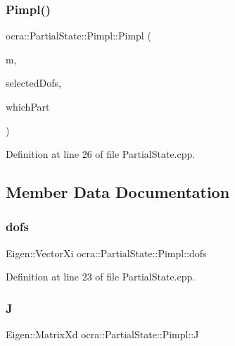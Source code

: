 \subsubsection{\texorpdfstring{Pimpl()}{Pimpl()}}
{\footnotesize\ttfamily ocra\+::\+Partial\+State\+::\+Pimpl\+::\+Pimpl (\begin{DoxyParamCaption}\item[{const Model \&}]{m,  }\item[{const Eigen\+::\+Vector\+Xi \&}]{selected\+Dofs,  }\item[{int}]{which\+Part }\end{DoxyParamCaption})\hspace{0.3cm}{\ttfamily [inline]}}



Definition at line 26 of file Partial\+State.\+cpp.



\subsection{Member Data Documentation}
\hypertarget{structocra_1_1PartialState_1_1Pimpl_a206c2d1097d24706e5bf2d3a9b0862a8}{}\label{structocra_1_1PartialState_1_1Pimpl_a206c2d1097d24706e5bf2d3a9b0862a8} 
\subsubsection{\texorpdfstring{dofs}{dofs}}
{\footnotesize\ttfamily Eigen\+::\+Vector\+Xi ocra\+::\+Partial\+State\+::\+Pimpl\+::dofs}



Definition at line 23 of file Partial\+State.\+cpp.

\hypertarget{structocra_1_1PartialState_1_1Pimpl_a7c31cf81faa6abbbe780b9f143094418}{}\label{structocra_1_1PartialState_1_1Pimpl_a7c31cf81faa6abbbe780b9f143094418} 
\subsubsection{\texorpdfstring{J}{J}}
{\footnotesize\ttfamily Eigen\+::\+Matrix\+Xd ocra\+::\+Partial\+State\+::\+Pimpl\+::J}



